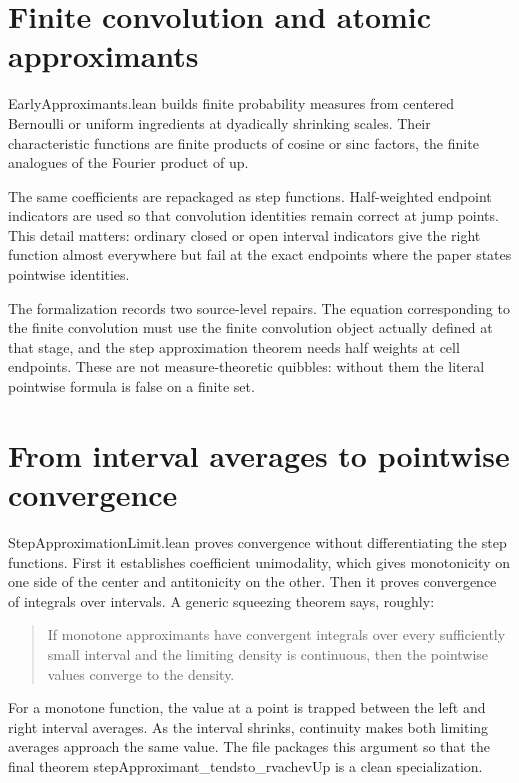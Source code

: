 \documentclass[11pt,a4paper,openany]{book}
\def\module#1{#1.lean}
\def\decl#1{#1}
\def\upfun{up}
\newcommand{\upfun}{\ensuremath{\operatorname{up}}}
\newcommand{\module}[1]{\nolinkurl{#1.lean}}
\newcommand{\decl}[1]{\texttt{\detokenize{#1}}}
\begin{document}
\section{Finite convolution and atomic approximants}
\module{EarlyApproximants} builds finite probability measures from centered
Bernoulli or uniform ingredients at dyadically shrinking scales.  Their
characteristic functions are finite products of cosine or sinc factors, the
finite analogues of the Fourier product of \upfun.

The same coefficients are repackaged as step functions.  Half-weighted endpoint
indicators are used so that convolution identities remain correct at jump
points.  This detail matters: ordinary closed or open interval indicators give
the right function almost everywhere but fail at the exact endpoints where the
paper states pointwise identities.

\begin{correction}
The formalization records two source-level repairs.  The equation corresponding
to the finite convolution must use the finite convolution object actually
defined at that stage, and the step approximation theorem needs half weights at
cell endpoints.  These are not measure-theoretic quibbles: without them the
literal pointwise formula is false on a finite set.
\end{correction}

\section{From interval averages to pointwise convergence}
\module{StepApproximationLimit} proves convergence without differentiating the
step functions.  First it establishes coefficient unimodality, which gives
monotonicity on one side of the center and antitonicity on the other.  Then it
proves convergence of integrals over intervals.  A generic squeezing theorem
says, roughly:

\begin{quote}
If monotone approximants have convergent integrals over every sufficiently
small interval and the limiting density is continuous, then the pointwise
values converge to the density.
\end{quote}

For a monotone function, the value at a point is trapped between the left and
right interval averages.  As the interval shrinks, continuity makes both
limiting averages approach the same value.  The file packages this argument so
that the final theorem
\decl{stepApproximant_tendsto_rvachevUp} is a clean specialization.
\end{document}
